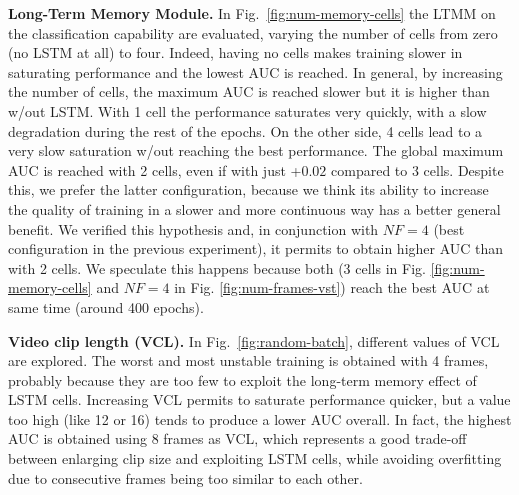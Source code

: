 \noindent\textbf{Long-Term Memory Module.}
In Fig.~\ref{fig:num-memory-cells} the LTMM on the classification capability are evaluated, varying the number of cells from zero (no LSTM at all) to four.
Indeed, having no cells makes training slower in saturating performance and the lowest AUC is reached.
In general, by increasing the number of cells, the maximum AUC is reached slower but it is higher than w/out LSTM.
With 1 cell the performance saturates very quickly, with a slow degradation during the rest of the epochs.
On the other side, 4 cells lead to a very slow saturation w/out reaching the best performance.
The global maximum AUC is reached with 2 cells, even if with just +$0.02$ compared to 3 cells.
Despite this, we prefer the latter configuration, because we think its ability to increase the quality of training in a slower and more continuous way has a better general benefit.
We verified this hypothesis and, in conjunction with $\mathit{NF}=4$ (best configuration in the previous experiment), it permits to obtain higher AUC than with 2 cells.
We speculate this happens because both (3 cells in Fig. \ref{fig:num-memory-cells} and $\mathit{NF}=4$ in Fig. \ref{fig:num-frames-vst}) reach the best AUC at same time (around 400 epochs).


\noindent\textbf{Video clip length (VCL).}
In Fig.~\ref{fig:random-batch}, different values of VCL are explored.
The worst and most unstable training is obtained with 4 frames, probably because they are too few to exploit the long-term memory effect of LSTM cells.
Increasing VCL permits to saturate performance quicker, but a value too high (like 12 or 16) tends to produce a lower AUC overall.
In fact, the highest AUC is obtained using 8 frames as VCL, which represents a good trade-off between enlarging clip size and exploiting LSTM cells, while avoiding overfitting due to consecutive frames being too similar to each other.


